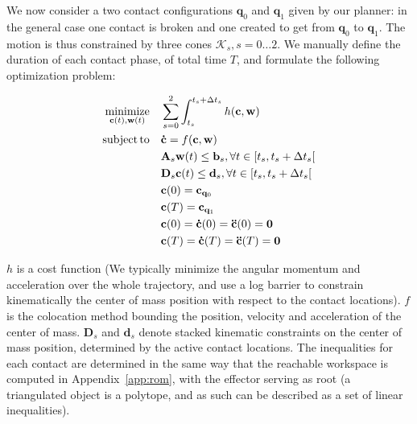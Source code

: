 We now consider a two contact configurations  $\mathbf{q}_0$ and $\mathbf{q}_1$ given by our planner: in the general case one contact is broken and one created to get from
$\mathbf{q}_0$ to $\mathbf{q}_1$. The motion is thus constrained by three cones $\mathcal{K}_s, s =0 \dots 2$. We manually define the duration of each contact phase, of total
time $T$, and formulate the following optimization problem:

\begin{equation} \label{eq:lin_prog_rob} \begin{aligned}
\operatorname*{minimize}_{\mathbf{c}(t), \mathbf{w}(t)}  \quad & \sum_{s=0}^{2} \int_{t_s}^{t_s + \Delta t_s}  h(\mathbf{c}, \mathbf{w})  \\
\operatorname*{subject\,to} \quad & \mathbf{\dot{c}} = f(\mathbf{c}, \mathbf{w}) \\
	\quad & \mathbf{A}_s \mathbf{w}(t)  \leq \mathbf{b}_s , \forall t \in  \left[t_s, t_s + \Delta t_s \right[ \\
	\quad & \mathbf{D}_s \mathbf{c}(t)  \leq \mathbf{d}_s , \forall t \in  \left[t_s, t_s + \Delta t_s \right[ \\
	\quad & \mathbf{c}(0)  = \mathbf{c}_{\mathbf{q}_0} \\
	\quad & \mathbf{c}(T)  = \mathbf{c}_{\mathbf{q}_1} \\
	\quad & \mathbf{c}(0)  = \mathbf{\dot{c}}(0)  = \mathbf{\ddot{c}}(0) = \mathbf{0}\\
	\quad & \mathbf{c}(T)  = \mathbf{\dot{c}}(T)  = \mathbf{\ddot{c}}(T) = \mathbf{0}\\
\end{aligned} \end{equation}

$h$ is a cost function (We typically minimize the angular momentum and acceleration over the whole trajectory, and use
a log barrier to constrain kinematically the center of mass position with respect to the contact locations). $f$ is the colocation method
bounding the position, velocity and acceleration of the center of mass. 
$\mathbf{D}_s$ and $\mathbf{d}_s$ denote stacked kinematic constraints on the center of mass position, determined by the active contact locations.
The inequalities for each contact are determined in the same way that the reachable workspace is computed in Appendix~\ref{app:rom}, with
the effector serving as root (a triangulated object is a polytope, and as such can be described as a set of linear inequalities).

